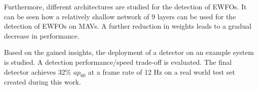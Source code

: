Furthermore, different architectures are studied for the detection of \acp{EWFO}. It can be seen how a relatively shallow network of 9 layers can be used for the detection of \acp{EWFO} on \acp{MAV}. A further reduction in weights leads to a gradual decrease in performance. 

Based on the gained insights, the deployment of a detector on an example system is studied. A detection performance/speed trade-off is evaluated. The final detector achieves 32\% $ap_{60}$ at a frame rate of 12 Hz on a real world test set created during this work.

